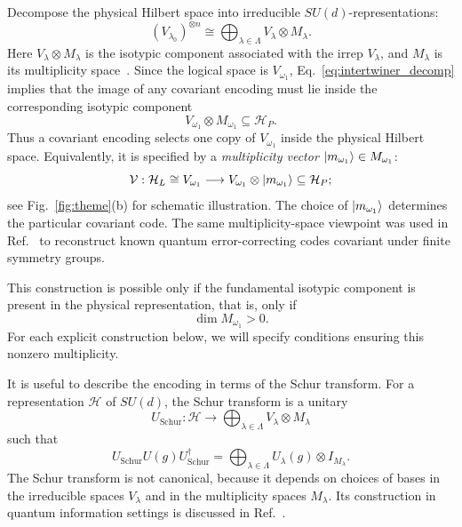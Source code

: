 \documentclass[10pt,twocolumn,superscriptaddress,aps,amsmath,amssymb,citeautoscript,floatfix,prx]{revtex4-2}
\theoremstyle{plain}
\theoremstyle{plain}
\theoremstyle{plain}
\theoremstyle{plain}
\theoremstyle{plain}
\theoremstyle{plain}
\theoremstyle{plain}
\theoremstyle{definition}
\theoremstyle{plain}
\begin{document}
Decompose the physical Hilbert space into irreducible $SU(d)$-representations:
\begin{equation}\label{eq:isotipic_decomp}
(V_{\lambda_0})^{\otimes n}
\cong
\bigoplus_{\lambda\in\Lambda}
V_\lambda\otimes M_\lambda .
\end{equation}
Here $V_\lambda\otimes M_\lambda$ is the isotypic component associated with the irrep $V_\lambda$, and $M_\lambda$ is its multiplicity space~\cite{Kong2022}. Since the logical space is $V_{\omega_1}$, Eq.~\eqref{eq:intertwiner_decomp} implies that the image of any covariant encoding must lie inside the corresponding isotypic component
$$
V_{\omega_1}\otimes M_{\omega_1}
\subseteq
\mathcal H_P .
$$
Thus a covariant encoding selects one copy of $V_{\omega_1}$ inside the physical Hilbert space. Equivalently, it is specified by a \textit{multiplicity vector} $\ket{m_{\omega_1}}\in M_{\omega_1}$:
\begin{equation}\label{eq:mult_vec_enc}
\mathcal{V}:
\mathcal H_L
\cong
V_{\omega_1}
\longrightarrow
V_{\omega_1}\otimes\ket{m_{\omega_1}}
\subseteq
\mathcal H_P;
\end{equation}
see Fig.~\ref{fig:theme}(b) for schematic illustration. The choice of $\ket{m_{\omega_1}}$ determines the particular covariant code. 
The same multiplicity-space viewpoint was used in Ref.~\cite{Denys2024} to reconstruct known quantum error-correcting codes covariant under 
finite symmetry groups.

This construction is possible only if the fundamental isotypic component is present in the physical representation, that is, only if
$$
\dim M_{\omega_1}>0 .
$$
For each explicit construction below, we will specify conditions ensuring this nonzero multiplicity.

It is useful to describe the encoding in terms of the Schur transform. For a representation $\mathcal H$ of $SU(d)$, 
the Schur transform is a unitary
$$
U_{\mathrm{Schur}}:
\mathcal H
\longrightarrow
\bigoplus_{\lambda\in\Lambda}
V_\lambda\otimes M_\lambda
$$
such that
\begin{equation}\label{eq:schur_transform}
U_{\mathrm{Schur}}
U(g)
U_{\mathrm{Schur}}^\dagger
=
\bigoplus_{\lambda\in\Lambda}
U_\lambda(g)\otimes I_{M_\lambda}.
\end{equation}
The Schur transform is not canonical, because it depends on choices of bases in the irreducible spaces $V_\lambda$ and in 
the multiplicity spaces $M_\lambda$. Its construction in quantum information settings is discussed in Ref.~\cite{Bacon2006}.
\end{document}

